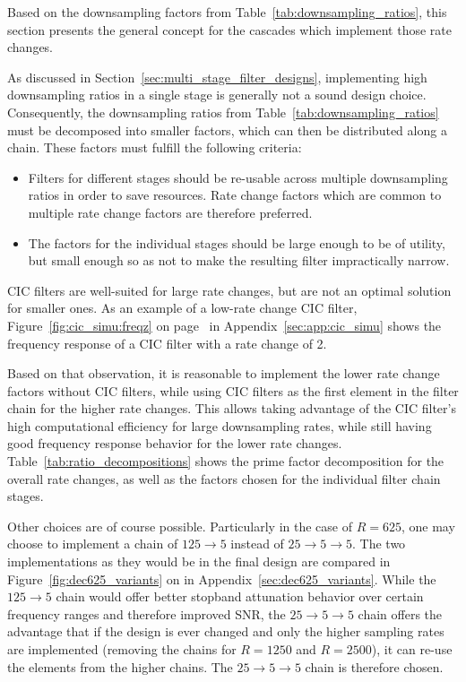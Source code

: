 Based  on the  downsampling factors  from Table~\ref{tab:downsampling_ratios},
this section  presents the  general concept for  the cascades  which implement
those rate changes.

As  discussed  in  Section~\ref{sec:multi_stage_filter_designs},  implementing
high   downsampling   ratios   in   a    single   stage   is   generally   not
a   sound   design   choice. Consequently,  the   downsampling   ratios   from
Table~\ref{tab:downsampling_ratios} must  be decomposed into  smaller factors,
which can then be distributed along a chain. These factors must fulfill the
following criteria:
\begin{itemize}\tightlist
    \item
        Filters  for  different stages  should  be  re-usable across  multiple
        downsampling ratios  in order  to save resources. Rate  change factors
        which  are  common  to  multiple rate  change  factors  are  therefore
        preferred.
    \item
        The factors for the individual stages  should be large enough to be of
        utility,  but small  enough so  as not  to make  the resulting  filter
        impractically narrow.
\end{itemize}
CIC  filters  are  well-suited  for  large   rate  changes,  but  are  not  an
optimal solution  for smaller  ones. As an  example of  a low-rate  change CIC
filter,  Figure~\ref{fig:cic_simu:freqz} on  page~\pageref{fig:cic_simu:freqz}
in  Appendix~\ref{sec:app:cic_simu}  shows the  frequency  response  of a  CIC
filter with a rate change of \num{2}.

Based on that observation, it is reasonable to implement the lower rate change
factors without CIC  filters, while using CIC filters as  the first element in
the filter  chain for  the higher rate  changes. This allows  taking advantage
of  the CIC  filter's  high computational  efficiency  for large  downsampling
rates,  while still  having good  frequency  response behavior  for the  lower
rate  changes. Table~\ref{tab:ratio_decompositions}  shows  the  prime  factor
decomposition for the overall rate changes,  as well as the factors chosen for
the individual filter chain stages.

Other choices are of course possible. Particularly in the case of $R=625$, one
may  choose  to implement  a  chain  of $125  \rightarrow  5$  instead of  $25
\rightarrow  5 \rightarrow  5$.   The  two implementations  as  they would  be
in  the  final  design  are compared  in  Figure~\ref{fig:dec625_variants}  on
\pageref{fig:dec625_variants} in Appendix~\ref{sec:dec625_variants}. While the
$125 \rightarrow 5$ chain would offer better stopband attunation behavior over
certain frequency  ranges and  therefore improved SNR,  the $25  \rightarrow 5
\rightarrow 5$ chain  offers the advantage that if the  design is ever changed
and only  the higher sampling rates  are implemented (removing the  chains for
$R=1250$ and $R=2500$), it can re-use the elements from the higher chains. The
$25 \rightarrow  5 \rightarrow 5$  chain is  therefore chosen.


